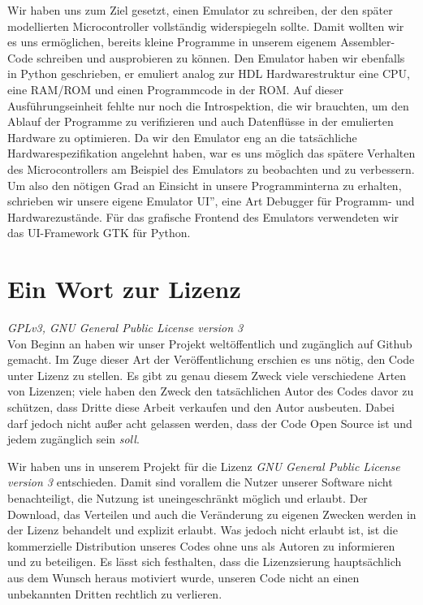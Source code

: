 Wir haben uns zum Ziel gesetzt, einen Emulator zu schreiben, der den später modellierten Microcontroller vollständig widerspiegeln sollte. Damit wollten wir es uns ermöglichen, bereits kleine Programme in unserem eigenem Assembler-Code schreiben und ausprobieren zu können. Den Emulator haben wir ebenfalls in Python geschrieben, er emuliert analog zur HDL Hardwarestruktur eine CPU, eine RAM/ROM und einen Programmcode in der ROM. Auf dieser Ausführungseinheit fehlte nur noch die Introspektion, die wir brauchten, um den Ablauf der Programme zu verifizieren und auch Datenflüsse in der emulierten Hardware zu optimieren. Da wir den Emulator eng an die tatsächliche Hardwarespezifikation angelehnt haben, war es uns möglich das spätere Verhalten des Microcontrollers am Beispiel des Emulators zu beobachten und zu verbessern. Um also den nötigen Grad an Einsicht in unsere Programminterna zu erhalten, schrieben wir unsere eigene \glqq Emulator UI'', eine Art Debugger für Programm- und Hardwarezustände. Für das grafische Frontend des Emulators verwendeten wir das UI-Framework GTK für Python.

\section{Ein Wort zur Lizenz} %
\textit{GPLv3, GNU General Public License version 3}\\
Von Beginn an haben wir unser Projekt weltöffentlich und zugänglich auf Github gemacht. Im Zuge dieser Art der Veröffentlichung erschien es uns nötig, den Code unter Lizenz zu stellen. Es gibt zu genau diesem Zweck viele verschiedene Arten von Lizenzen; viele haben den Zweck den tatsächlichen Autor des Codes davor zu schützen, dass Dritte diese Arbeit verkaufen und den Autor ausbeuten. Dabei darf jedoch nicht außer acht gelassen werden, dass der Code Open Source ist und jedem zugänglich sein \textit{soll}.

Wir haben uns in unserem Projekt für die Lizenz \textit{GNU General Public License version 3} entschieden. Damit sind vorallem die Nutzer unserer Software nicht benachteiligt, die Nutzung ist uneingeschränkt möglich und erlaubt. Der Download, das Verteilen und auch die Veränderung zu eigenen Zwecken werden in der Lizenz behandelt und explizit erlaubt. Was jedoch nicht erlaubt ist, ist die kommerzielle Distribution unseres Codes ohne uns als Autoren zu informieren und zu beteiligen. Es lässt sich festhalten, dass die Lizenzsierung hauptsächlich aus dem Wunsch heraus motiviert wurde, unseren Code nicht an einen unbekannten Dritten rechtlich zu verlieren.


